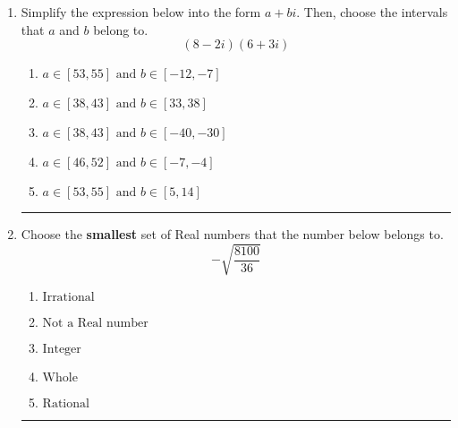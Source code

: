 \documentclass[14pt]{extbook}
\newcommand{\litem}[1]{\item#1\hspace*{-1cm}\rule{\textwidth}{0.4pt}}
\begin{document}
\begin{enumerate}
{\begin{enumerate}[label=\Alph*.]
\end{enumerate} }
\litem{
Simplify the expression below into the form $a+bi$. Then, choose the intervals that $a$ and $b$ belong to.\[ (8 - 2 i)(6 + 3 i) \]\begin{enumerate}[label=\Alph*.]
\item \( a \in [53, 55] \text{ and } b \in [-12, -7] \)
\item \( a \in [38, 43] \text{ and } b \in [33, 38] \)
\item \( a \in [38, 43] \text{ and } b \in [-40, -30] \)
\item \( a \in [46, 52] \text{ and } b \in [-7, -4] \)
\item \( a \in [53, 55] \text{ and } b \in [5, 14] \)

\end{enumerate} }
\litem{
Choose the \textbf{smallest} set of Real numbers that the number below belongs to.\[ -\sqrt{\frac{8100}{36}} \]\begin{enumerate}[label=\Alph*.]
\item \( \text{Irrational} \)
\item \( \text{Not a Real number} \)
\item \( \text{Integer} \)
\item \( \text{Whole} \)
\item \( \text{Rational} \)

\end{enumerate} }
\end{enumerate}
\end{document}
